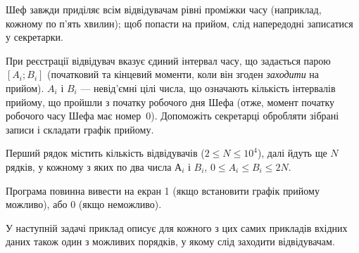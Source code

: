 ﻿Шеф завжди приділяє всім відвідувачам рівні проміжки часу (наприклад, кожному по п'ять хвилин); щоб попасти на прийом, слід напередодні записатися у секретарки.

При реєстрації відвідувач вказує єдиний інтервал часу, що задається парою $[A_i; B_i]$ (початковий та кінцевий моменти, коли він згоден \emph{заходити} на прийом). $A_i$ і $B_i$ --- невід’ємні цілі числа, що означають кількість інтервалів прийому, що пройшли з початку робочого дня Шефа (отже, момент початку робочого часу Шефа має номер~0). Допоможіть секретарці обробляти зібрані записи і складати графік прийому.

\InputFile
Перший рядок містить кількість відвідувачів ($2\leqslant N\leqslant 10^4$), далі йдуть ще $N$ рядків, у кожному з яких по два числа $А_i$ і $B_i$, $0\leqslant A_i\leqslant B_i\leqslant 2N$.

\OutputFile
Програма повинна вивести на екран 1 (якщо встановити графік
прийому можливо), або 0 (якщо неможливо). 

\Examples
\begin{example}
\end{example}

\Note
У наступній задачі приклад описує для кожного з цих самих прикладів вхідних даних також один з можливих порядків, у якому слід заходити відвідувачам.